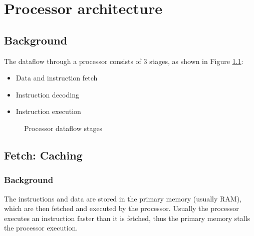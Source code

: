 \documentclass{report}
\begin{document}
\chapter{Processor architecture}

\section{Background}

The dataflow through a processor consists of 3 stages, as shown in Figure
\ref{fig:processor-dataflow-stages}:

\begin{itemize}

\item Data and instruction fetch
\item Instruction decoding
\item Instruction execution

\end{itemize}

\begin {figure}[H]
\centering
{}
\caption {Processor dataflow stages}
\label {fig:processor-dataflow-stages}
\end {figure}



\section{Fetch: Caching}

\subsection{Background}

The instructions and data are stored in the primary memory (usually RAM), which
are then fetched and executed by the processor. Usually the processor executes
an instruction faster than it is fetched, thus the primary memory stalls the
processor execution.
\end{document}
